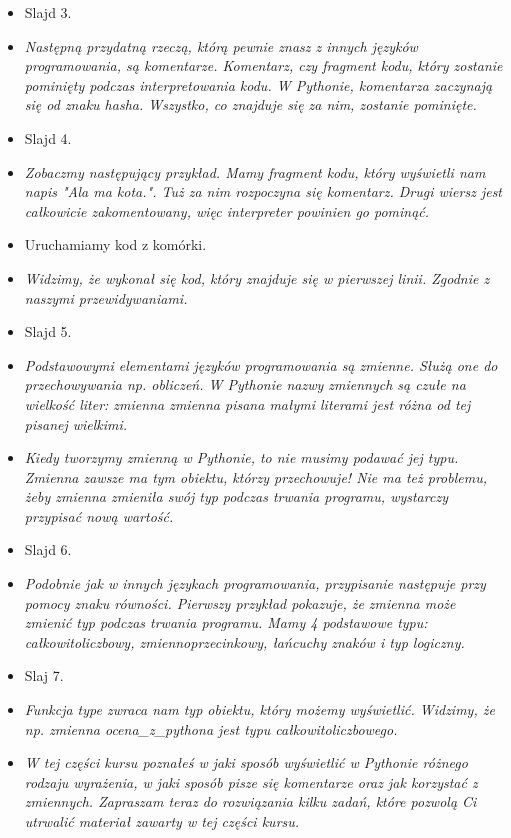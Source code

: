 \documentclass{mwart}
\begin{document}
\begin{itemize}
  \item Slajd 3.
  \item \emph{Następną przydatną rzeczą, którą pewnie znasz z innych języków
      programowania, są komentarze. Komentarz, czy fragment kodu, który zostanie
      pominięty podczas interpretowania kodu. W Pythonie, komentarza zaczynają się od
      znaku hasha. Wszystko, co znajduje się za nim, zostanie pominięte.}
  \item Slajd 4.
  \item \emph{Zobaczmy następujący przykład. Mamy fragment kodu, który wyświetli nam
      napis "Ala ma kota.". Tuż za nim rozpoczyna się komentarz. Drugi wiersz jest
      całkowicie zakomentowany, więc interpreter powinien go pominąć.}
  \item Uruchamiamy kod z komórki.
  \item \emph{Widzimy, że wykonał się kod, który znajduje się w pierwszej linii. Zgodnie z
      naszymi przewidywaniami.}
  \item Slajd 5.
  \item \emph{Podstawowymi elementami języków programowania są zmienne. Służą one do
      przechowywania np. obliczeń. W Pythonie nazwy zmiennych są czułe na wielkość
      liter: zmienna zmienna pisana małymi literami jest różna od tej pisanej wielkimi.}
  \item \emph{Kiedy tworzymy zmienną w Pythonie, to nie musimy podawać jej typu. Zmienna
      zawsze ma tym obiektu, którzy przechowuje! Nie ma też problemu, żeby zmienna
      zmieniła swój typ podczas trwania programu, wystarczy przypisać nową wartość.}
  \item Slajd 6.
  \item \emph{Podobnie jak w innych językach programowania, przypisanie następuje przy
      pomocy znaku równości. Pierwszy przykład pokazuje, że zmienna może zmienić typ
      podczas trwania programu. Mamy 4 podstawowe typu: całkowitoliczbowy,
      zmiennoprzecinkowy, łańcuchy znaków i typ logiczny.}
  \item Slaj 7.
  \item \emph{Funkcja type zwraca nam typ obiektu, który możemy wyświetlić. Widzimy, że
      np. zmienna ocena\_z\_pythona jest typu całkowitoliczbowego.}
  \item \emph{W tej części kursu poznałeś w jaki sposób wyświetlić w Pythonie różnego
      rodzaju wyrażenia, w jaki sposób pisze się komentarze oraz jak korzystać z
      zmiennych. Zapraszam teraz do rozwiązania kilku zadań, które pozwolą Ci utrwalić
      materiał zawarty w tej części kursu.}
\end{itemize}
\end{document}
